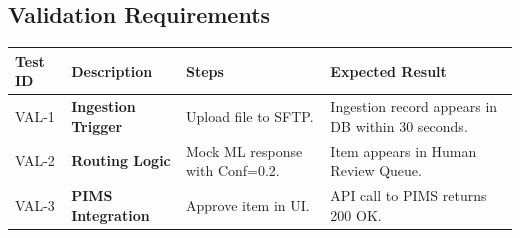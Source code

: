 \documentclass[12pt, a4paper]{article}
\begin{document}
\subsection{Validation Requirements}
\begin{longtable}{@{}p{2cm} >{\raggedright\arraybackslash}p{3.8cm} >{\raggedright\arraybackslash}p{3.8cm} >{\raggedright\arraybackslash}p{3.8cm}@{}}
\toprule
\textbf{Test ID} & \textbf{Description} & \textbf{Steps} & \textbf{Expected Result} \\
\midrule
VAL-1 & \textbf{Ingestion Trigger} & Upload file to SFTP. & Ingestion record appears in DB within 30 seconds. \\
\addlinespace
VAL-2 & \textbf{Routing Logic} & Mock ML response with Conf=0.2. & Item appears in Human Review Queue. \\
\addlinespace
VAL-3 & \textbf{PIMS Integration} & Approve item in UI. & API call to PIMS returns 200 OK. \\
\bottomrule
\end{longtable}
\end{document}
